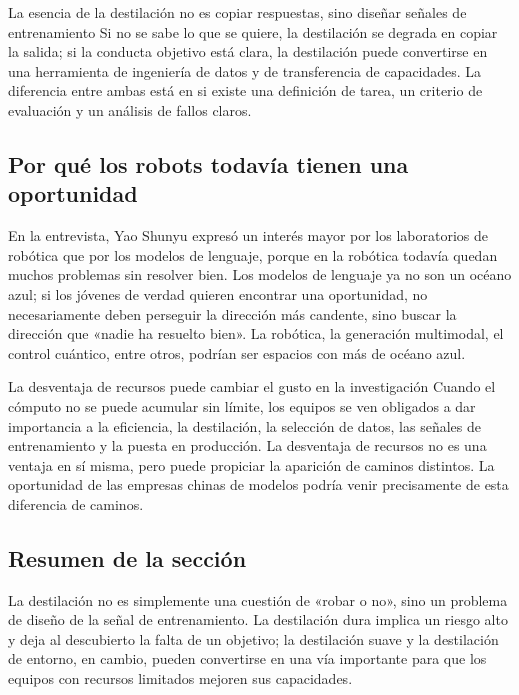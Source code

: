 \documentclass[a4paper]{article}
\begin{document}
\begin{importantbox}{La esencia de la destilación no es copiar respuestas, sino diseñar señales de entrenamiento}
Si no se sabe lo que se quiere, la destilación se degrada en copiar la salida; si la conducta objetivo está clara, la destilación puede convertirse en una herramienta de ingeniería de datos y de transferencia de capacidades. La diferencia entre ambas está en si existe una definición de tarea, un criterio de evaluación y un análisis de fallos claros.
\end{importantbox}

\subsection{Por qué los robots todavía tienen una oportunidad}

En la entrevista, Yao Shunyu expresó un interés mayor por los laboratorios de robótica que por los modelos de lenguaje, porque en la robótica todavía quedan muchos problemas sin resolver bien. Los modelos de lenguaje ya no son un océano azul; si los jóvenes de verdad quieren encontrar una oportunidad, no necesariamente deben perseguir la dirección más candente, sino buscar la dirección que «nadie ha resuelto bien». La robótica, la generación multimodal, el control cuántico, entre otros, podrían ser espacios con más de océano azul.

\begin{knowledgebox}{La desventaja de recursos puede cambiar el gusto en la investigación}
Cuando el cómputo no se puede acumular sin límite, los equipos se ven obligados a dar importancia a la eficiencia, la destilación, la selección de datos, las señales de entrenamiento y la puesta en producción. La desventaja de recursos no es una ventaja en sí misma, pero puede propiciar la aparición de caminos distintos. La oportunidad de las empresas chinas de modelos podría venir precisamente de esta diferencia de caminos.
\end{knowledgebox}

\subsection{Resumen de la sección}

La destilación no es simplemente una cuestión de «robar o no», sino un problema de diseño de la señal de entrenamiento. La destilación dura implica un riesgo alto y deja al descubierto la falta de un objetivo; la destilación suave y la destilación de entorno, en cambio, pueden convertirse en una vía importante para que los equipos con recursos limitados mejoren sus capacidades.
\end{document}
